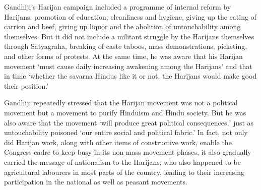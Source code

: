 Gandhiji's Harijan campaign included a programme of internal reform by Harijans: promotion of education, cleanliness and hygiene, giving up the eating of carrion and beef, giving up liquor and the abolition of untouchability among themselves. But it did not include a militant struggle by the Harijans themselves through Satyagraha, breaking of caste taboos, mass demonstrations, picketing, and other forms of protests. At the same time, he was aware that his Harijan movement `must cause daily increasing awakening among the Harijans' and that in time `whether the savarna Hindus like it or not, the Harijans would make good their position.' 

Gandhiji repeatedly stressed that the Harijan movement was not a political movement but a movement to purify Hinduism and Hindu society. But he was also aware that the movement `will produce great political consequences,' just as untouchability poisoned `our entire social and political fabric.' In fact, not only did Harijan work, along with other items of constructive work, enable the Congress cadre to keep busy in its non-mass movement phases, it also gradually carried the message of nationalism to the Harijans, who also happened to be agricultural labourers in most parts of the country, leading to their increasing participation in the national as well as peasant movements.
